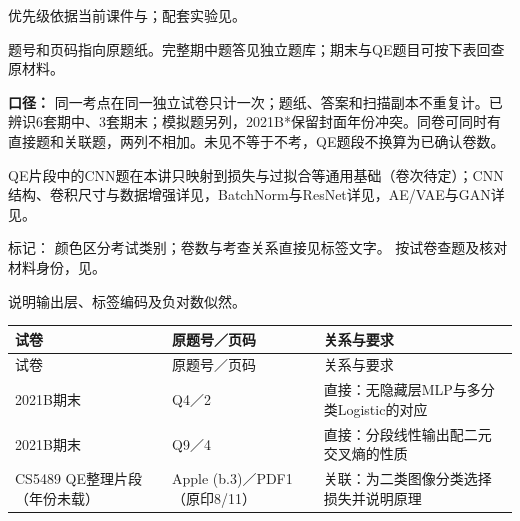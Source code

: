 优先级依据当前课件与；配套实验见。



题号和页码指向原题纸。完整期中题答见独立题库；期末与QE题目可按下表回查原材料。




\textbf{口径：} 同一考点在同一独立试卷只计一次；题纸、答案和扫描副本不重复计。已辨识6套期中、3套期末；模拟题另列，2021B*保留封面年份冲突。同卷可同时有直接题和关联题，两列不相加。未见不等于不考，QE题段不换算为已确认卷数。


QE片段中的CNN题在本讲只映射到损失与过拟合等通用基础（卷次待定）；CNN结构、卷积尺寸与数据增强详见，BatchNorm与ResNet详见，AE/VAE与GAN详见。


标记：   颜色区分考试类别；卷数与考查关系直接见标签文字。
按试卷查题及核对材料身份，见。



说明输出层、标签编码及负对数似然。

\begingroup\small\setlength{\tabcolsep}{3pt}\renewcommand{\arraystretch}{1.22}
\begin{longtable}{@{}>{\raggedright\arraybackslash}p{}>{\raggedright\arraybackslash}p{}>{\raggedright\arraybackslash}p{}@{}}
\toprule
试卷 & 原题号／页码 & 关系与要求 \\
\midrule\endfirsthead
试卷 & 原题号／页码 & 关系与要求 \\
\midrule\endhead
\bottomrule\endfoot
2021B期末 & Q4／2 & 直接：无隐藏层MLP与多分类Logistic的对应 \\
2021B期末 & Q9／4 & 直接：分段线性输出配二元交叉熵的性质 \\
CS5489 QE整理片段（年份未载） & Apple (b.3)／PDF1（原印8/11） & 关联：为二类图像分类选择损失并说明原理 \\
\end{longtable}\endgroup

